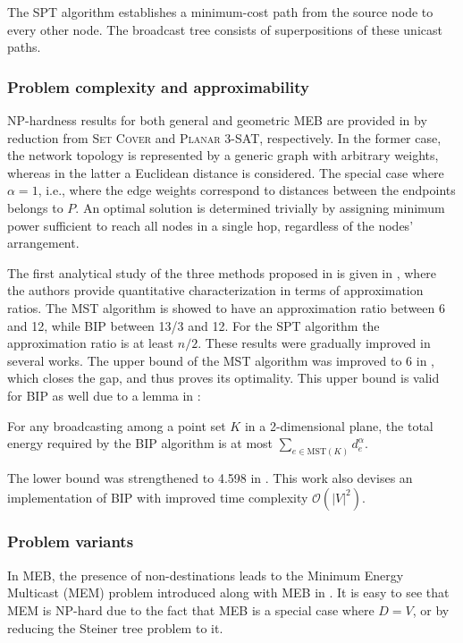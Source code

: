 The SPT algorithm establishes a minimum-cost path from the source node to every other node. The broadcast tree consists of superpositions of these unicast paths.

\subsubsection{Problem complexity and approximability}

NP-hardness results for both general and geometric MEB are provided in \cite{cagalj02} by reduction from \textsc{Set Cover} and \textsc{Planar 3-SAT}, respectively.
In the former case, the network topology is represented by a generic graph with arbitrary weights, whereas in the latter a Euclidean distance is considered.
The special case where $\alpha=1$, i.e., where the edge weights correspond to distances between the endpoints belongs to $P$.
An optimal solution is determined trivially by assigning minimum power sufficient to reach all nodes in a single hop, regardless of the nodes' arrangement.

The first analytical study of the three methods proposed in \cite{wieselthier00} is given in \cite{wan02}, where the authors provide quantitative characterization in terms of approximation ratios.
The MST algorithm is showed to have an approximation ratio between 6 and 12, while BIP between 13/3 and 12.
For the SPT algorithm the approximation ratio is at least $n/2$.
These results were gradually improved in several works. 
The upper bound of the MST algorithm was improved to 6 in \cite{ambuhl05}, which closes the gap, and thus proves its optimality.
This upper bound is valid for BIP as well due to a lemma in \cite{wan02}:
\begin{lemma}
For any broadcasting among a point set $K$ in a 2-dimensional plane, the total energy required by the BIP algorithm is at most $\sum_{e\in \text{MST}(K)}d_e^\alpha$.
\end{lemma}
The lower bound was strengthened to 4.598 in \cite{bauer09}. 
This work also devises an implementation of BIP with improved time complexity $\mathcal{O}(|V|^2)$.

\subsubsection{Problem variants}

In MEB, the presence of non-destinations leads to the Minimum Energy Multicast (MEM) problem introduced along with MEB in \cite{wieselthier00}.
It is easy to see that MEM is NP-hard due to the fact that MEB is a special case where $D=V$, or by reducing the Steiner tree problem to it.

